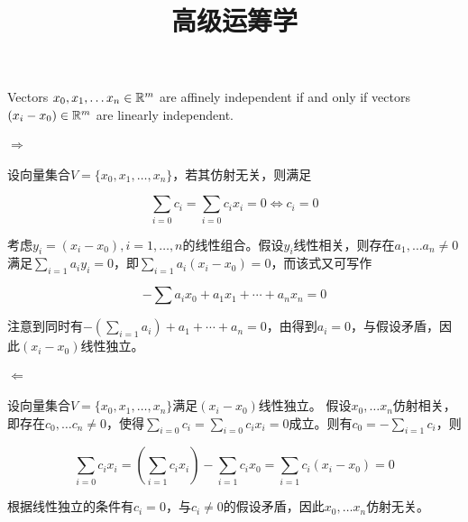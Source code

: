 \documentclass{../notes}
\title{高级运筹学}
\begin{document}
    \maketitle

    Vectors $x_0, x_1, \ldots x_n\in \mathbb R^m$ are affinely independent if and only if vectors $(x_i - x_0)\in \mathbb R^m$ are linearly independent.

    \paragraph*{$\Rightarrow$} 设向量集合$V = \{x_0, x_1, \ldots, x_n\}$，若其仿射无关，则满足

    \begin{equation}
        \sum_{i=0} c_i = \sum_{i=0} c_i x_i = 0 \Leftrightarrow c_i = 0
        \label{eq:1}
    \end{equation}

    考虑$y_i = (x_i - x_0), i = 1, \ldots, n$的线性组合。假设$y_i$线性相关，则存在$a_1, \ldots a_n \not = 0$满足$\sum_{i=1} a_i y_i = 0$，即$\sum_{i=1} a_i(x_i - x_0) = 0$，而该式又可写作

    \begin{equation}
        -\sum a_i x_0 + a_1x_1 + \cdots + a_n x_n = 0
        \label{eq:2}
    \end{equation}

    注意到同时有$-\left(\sum_{i=1} a_i\right) + a_1 + \cdots + a_n = 0$，由得到$a_i = 0$，与假设矛盾，因此$(x_i - x_0)$线性独立。

    \paragraph*{$\Leftarrow$} 设向量集合$V = \{x_0, x_1, \ldots, x_n\}$满足$(x_i - x_0)$线性独立。    假设$x_0, \ldots x_n$仿射相关，即存在$c_0, \ldots c_n \not = 0$，使得$\sum_{i=0} c_i = \sum_{i=0} c_i x_i = 0$成立。则有$c_0 = -\sum_{i=1} c_i$，则

    \begin{equation}
        \sum_{i=0}c_i x_i = \left(\sum_{i=1} c_i x_i\right) - \sum_{i=1}c_i x_0 = \sum_{i=1} c_i(x_i - x_0) = 0 \label{eq:3}
    \end{equation}

    根据线性独立的条件有$c_i = 0$，与$c_i\not = 0$的假设矛盾，因此$x_0, \ldots x_n$仿射无关。
\end{document}
